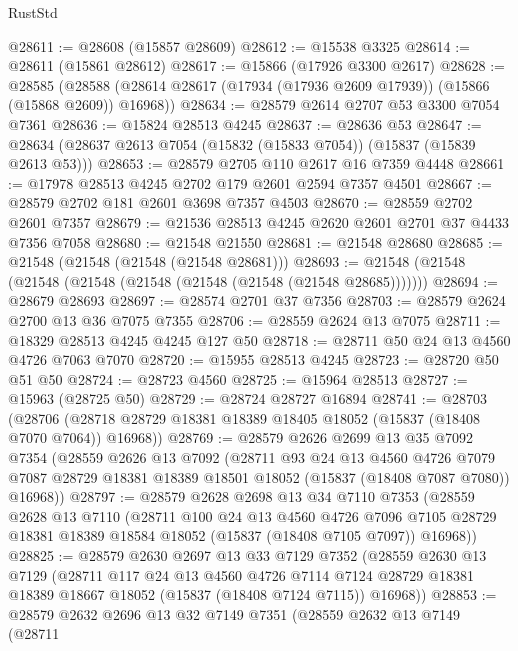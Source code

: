 \begin{lexlean}{RustStd}
\begin{coremodule}
{\begin{coremodule}
{{{{{{{{{{{{{{{{{{{{{{{{{{{{{{{{{{{{{{{{{{{{{{{{{{{{{{{{{{{{@28611 := @28608 (@15857 @28609)
@28612 := @15538 @3325
@28614 := @28611 (@15861 @28612)
@28617 := @15866 (@17926 @3300 @2617)
@28628 := @28585
    (@28588 (@28614 @28617 (@17934 (@17936 @2609 @17939)) (@15866 (@15868 @2609)) @16968))
@28634 := @28579 @2614 @2707 @53 @3300 @7054 @7361
@28636 := @15824 @28513 @4245
@28637 := @28636 @53
@28647 := @28634 (@28637 @2613 @7054 (@15832 (@15833 @7054)) (@15837 (@15839 @2613 @53)))
@28653 := @28579 @2705 @110 @2617 @16 @7359 @4448
@28661 := @17978 @28513 @4245 @2702 @179 @2601 @2594 @7357 @4501
@28667 := @28579 @2702 @181 @2601 @3698 @7357 @4503
@28670 := @28559 @2702 @2601 @7357
@28679 := @21536 @28513 @4245 @2620 @2601 @2701 @37 @4433 @7356 @7058
@28680 := @21548 @21550
@28681 := @21548 @28680
@28685 := @21548 (@21548 (@21548 (@21548 @28681)))
@28693 := @21548 (@21548 (@21548 (@21548 (@21548 (@21548 (@21548 (@21548 @28685)))))))
@28694 := @28679 @28693
@28697 := @28574 @2701 @37 @7356
@28703 := @28579 @2624 @2700 @13 @36 @7075 @7355
@28706 := @28559 @2624 @13 @7075
@28711 := @18329 @28513 @4245 @4245 @127 @50
@28718 := @28711 @50 @24 @13 @4560 @4726 @7063 @7070
@28720 := @15955 @28513 @4245
@28723 := @28720 @50 @51 @50
@28724 := @28723 @4560
@28725 := @15964 @28513
@28727 := @15963 (@28725 @50)
@28729 := @28724 @28727 @16894
@28741 := @28703
    (@28706 (@28718 @28729 @18381 @18389 @18405 @18052 (@15837 (@18408 @7070 @7064)) @16968))
@28769 := @28579
    @2626
    @2699
    @13
    @35
    @7092
    @7354
    (@28559
      @2626
      @13
      @7092
      (@28711
        @93
        @24
        @13
        @4560
        @4726
        @7079
        @7087
        @28729
        @18381
        @18389
        @18501
        @18052
        (@15837 (@18408 @7087 @7080))
        @16968))
@28797 := @28579
    @2628
    @2698
    @13
    @34
    @7110
    @7353
    (@28559
      @2628
      @13
      @7110
      (@28711
        @100
        @24
        @13
        @4560
        @4726
        @7096
        @7105
        @28729
        @18381
        @18389
        @18584
        @18052
        (@15837 (@18408 @7105 @7097))
        @16968))
@28825 := @28579
    @2630
    @2697
    @13
    @33
    @7129
    @7352
    (@28559
      @2630
      @13
      @7129
      (@28711
        @117
        @24
        @13
        @4560
        @4726
        @7114
        @7124
        @28729
        @18381
        @18389
        @18667
        @18052
        (@15837 (@18408 @7124 @7115))
        @16968))
@28853 := @28579
    @2632
    @2696
    @13
    @32
    @7149
    @7351
    (@28559
      @2632
      @13
      @7149
      (@28711
}}}}}}}}}}}}}}}}}}}}}}}}}}}}}}}}}}}}}}}}}}}}}}}}}}}}}}}}}}}}
\end{coremodule}}
\end{coremodule}
\end{lexlean}
